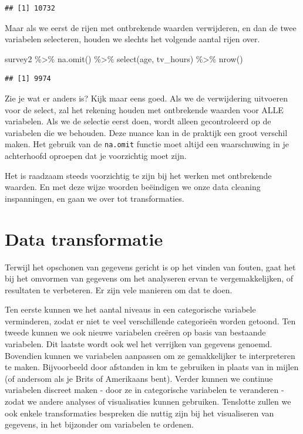 \documentclass[]{tufte-book}
\newenvironment{Shaded}{}{}
\newcommand{\FunctionTok}[1]{\textcolor[rgb]{0.02,0.16,0.49}{#1}}
\newcommand{\NormalTok}[1]{#1}
\newcommand{\SpecialCharTok}[1]{\textcolor[rgb]{0.25,0.44,0.63}{#1}}
\begin{document}
\begin{verbatim}
## [1] 10732
\end{verbatim}

Maar als we eerst de rijen met ontbrekende waarden verwijderen, en dan de twee variabelen selecteren, houden we slechts het volgende aantal rijen over.

\begin{Shaded}
\begin{Highlighting}[]
\NormalTok{survey2 }\SpecialCharTok{\%\textgreater{}\%}
  \FunctionTok{na.omit}\NormalTok{() }\SpecialCharTok{\%\textgreater{}\%}
  \FunctionTok{select}\NormalTok{(age, tv\_hours) }\SpecialCharTok{\%\textgreater{}\%}
  \FunctionTok{nrow}\NormalTok{()}
\end{Highlighting}
\end{Shaded}

\begin{verbatim}
## [1] 9974
\end{verbatim}

Zie je wat er anders is? Kijk maar eens goed. Als we de verwijdering uitvoeren voor de select, zal het rekening houden met ontbrekende waarden voor ALLE variabelen. Als we de selectie eerst doen, wordt alleen gecontroleerd op de variabelen die we behouden. Deze nuance kan in de praktijk een groot verschil maken. Het gebruik van de \texttt{na.omit} functie moet altijd een waarschuwing in je achterhoofd oproepen dat je voorzichtig moet zijn.

Het is raadzaam steeds voorzichtig te zijn bij het werken met ontbrekende waarden. En met deze wijze woorden beëindigen we onze data cleaning inspanningen, en gaan we over tot transformaties.

\hypertarget{data-transformatie}{%
\section{Data transformatie}\label{data-transformatie}}

Terwijl het opschonen van gegevens gericht is op het vinden van fouten, gaat het bij het omvormen van gegevens om het analyseren ervan te vergemakkelijken, of resultaten te verbeteren. Er zijn vele manieren om dat te doen.

Ten eerste kunnen we het aantal niveaus in een categorische variabele verminderen, zodat er niet te veel verschillende categorieën worden getoond. Ten tweede kunnen we ook nieuwe variabelen creëren op basis van bestaande variabelen. Dit laatste wordt ook wel het verrijken van gegevens genoemd. Bovendien kunnen we variabelen aanpassen om ze gemakkelijker te interpreteren te maken. Bijvoorbeeld door afstanden in km te gebruiken in plaats van in mijlen (of andersom als je Brits of Amerikaans bent). Verder kunnen we continue variabelen discreet maken - door ze in categorische variabelen te veranderen - zodat we andere analyses of visualisaties kunnen gebruiken. Tenslotte zullen we ook enkele transformaties bespreken die nuttig zijn bij het visualiseren van gegevens, in het bijzonder om variabelen te ordenen.
\end{document}
